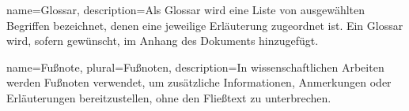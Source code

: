{
	name=Glossar,
	description={Als Glossar wird eine Liste von ausgewählten Begriffen bezeichnet, denen eine jeweilige Erläuterung zugeordnet ist. Ein Glossar wird, sofern gewünscht, im Anhang des Dokuments hinzugefügt.}
}

{
	name=Fußnote,
	plural=Fußnoten,
	description={In wissenschaftlichen Arbeiten werden Fußnoten verwendet, um zusätzliche Informationen, Anmerkungen oder Erläuterungen bereitzustellen, ohne den Fließtext zu unterbrechen.}
}